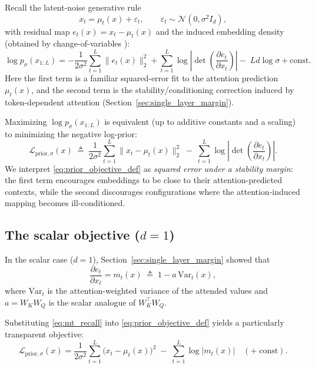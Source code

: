 \documentclass[11pt]{article}
\begin{document}
Recall the latent-noise generative rule
\begin{equation}
x_t = \mu_t(x) + \varepsilon_t,
\qquad
\varepsilon_t \sim \mathcal{N}(0,\sigma^2 I_d),
\label{eq:latent_noise_sigma_recall}
\end{equation}
with residual map $e_t(x)=x_t-\mu_t(x)$ and the induced embedding density
(obtained by change-of-variables \citep{PapamakariosNaReMoLa21}):
\begin{equation}
\log p_\sigma(x_{1:L})
=
-\frac{1}{2\sigma^2}\sum_{t=1}^L \|e_t(x)\|_2^2
+
\sum_{t=1}^L \log\left|\det\!\left(\frac{\partial e_t}{\partial x_t}\right)\right|
-\;Ld\log\sigma
+\mathrm{const}.
\label{eq:logpx_general_sigma}
\end{equation}
Here the first term is a familiar squared-error fit to the attention prediction $\mu_t(x)$,
and the second term is the stability/conditioning correction induced by token-dependent attention
(Section~\ref{sec:single_layer_margin}).

Maximizing $\log p_\sigma(x_{1:L})$ is equivalent (up to additive constants and a scaling)
to minimizing the negative log-prior:
\begin{equation}
\mathcal{L}_{\mathrm{prior},\sigma}(x)
\;\triangleq\;
\frac{1}{2\sigma^2}\sum_{t=1}^L \|x_t-\mu_t(x)\|_2^2
\;-\;
\sum_{t=1}^L \log\left|\det\!\left(\frac{\partial e_t}{\partial x_t}\right)\right|.
\label{eq:prior_objective_def}
\end{equation}
We interpret \eqref{eq:prior_objective_def} as \emph{squared error under a stability margin}:
the first term encourages embeddings to be close to their attention-predicted contexts,
while the second discourages configurations where the attention-induced mapping becomes ill-conditioned.

\subsection{The scalar objective (\texorpdfstring{$d=1$}{d=1})}

In the scalar case ($d=1$), Section~\ref{sec:single_layer_margin} showed that
\begin{equation}
\frac{\partial e_t}{\partial x_t}
=
m_t(x)
\;\triangleq\;
1-a\,\mathrm{Var}_t(x),
\label{eq:mt_recall}
\end{equation}
where $\mathrm{Var}_t$ is the attention-weighted variance of the attended values and
$a=W_KW_Q$ is the scalar analogue of $W_K^\top W_Q$.

Substituting \eqref{eq:mt_recall} into \eqref{eq:prior_objective_def} yields a particularly
transparent objective:
\begin{equation}
\mathcal{L}_{\mathrm{prior},\sigma}(x)
=
\frac{1}{2\sigma^2}\sum_{t=1}^L \big(x_t-\mu_t(x)\big)^2
\;-\;
\sum_{t=1}^L \log|m_t(x)|
\quad (+\;\text{const}).
\label{eq:scalar_prior_objective}
\end{equation}
\end{document}
